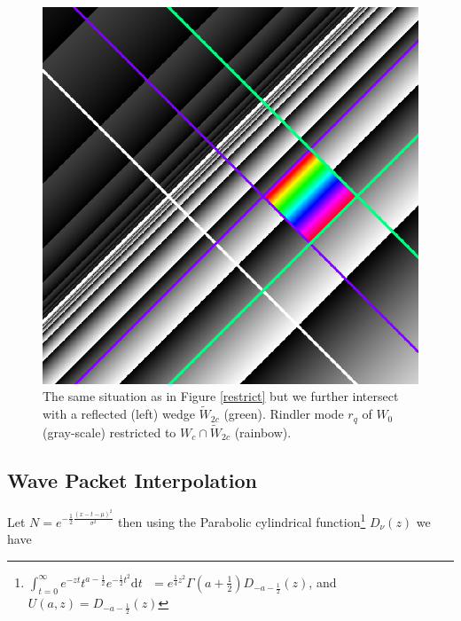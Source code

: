 \documentclass[12pt,a4paper]{article}
\newcommand{\dv}[1]{\mathrm{d} #1 \text{ }}
\begin{document}
\begin{figure}[h]
  \centering
\includegraphics[scale=0.4]{diamond_in_wedge.png}
\caption{The same situation as in Figure \ref{restrict} but we further intersect with a reflected (left) wedge $\widetilde{W}_{2c}$ (green). Rindler mode $r_q$ of $W_0$ (gray-scale) restricted to $W_c \cap \widetilde{W}_{2c}$ (rainbow).}
\label{diamond}
\end{figure}




\subsection{Wave Packet Interpolation}
Let $N = e^{-\frac{1}{2} \frac{(x-t-\mu)^2}{\sigma^2}}$ then using the Parabolic cylindrical function\footnote{$\int_{t=0}^\infty e^{-zt} t^{a-\frac{1}{2}} e^{-\frac{1}{2} t^2} \dv{t} = e^{\frac{1}{4}z^2} \Gamma\left(a + \frac{1}{2}\right) D_{-a - \frac{1}{2}}\left(z\right)$, and $U(a,z) = D_{-a - \frac{1}{2}}\left(z\right)$} $D_\nu(z)$ we have
\end{document}
